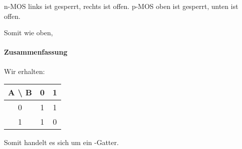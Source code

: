 n-MOS links ist gesperrt, rechts ist offen. p-MOS oben ist gesperrt, unten ist
offen.

Somit wie oben, \thigh

\paragraph{Zusammenfassung}

Wir erhalten:

\begin{tabular}{c|cc}
	A \textbackslash{} B & 0 & 1 \\
	\hline
	0 & 1 & 1 \\
	1 & 1 & 0
\end{tabular}

Somit handelt es sich um ein \tnand-Gatter.


\FloatBarrier
\IfFileExists{\bibliographyfile}{
	
}{}



